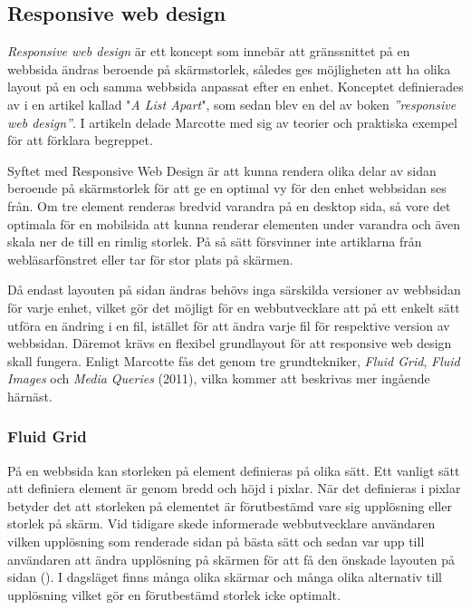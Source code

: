 \documentclass[11pt]{article}
\begin{document}
\subsection{Responsive web design}
\textit{Responsive web design} är ett koncept som innebär att gränssnittet på en webbsida ändras beroende på skärmstorlek, således ges möjligheten att ha olika layout på en och samma webbsida anpassat efter en enhet. Konceptet definierades av \cite{resp} i en artikel kallad "\textit{A List Apart}", som sedan blev en del av boken \textit{”responsive web design”}. I artikeln delade Marcotte med sig av teorier och praktiska exempel för att förklara begreppet. 

Syftet med Responsive Web Design är att kunna rendera olika delar av sidan beroende på skärmstorlek för att ge en optimal vy för den enhet webbsidan ses från. Om tre element renderas bredvid varandra på en desktop sida, så vore det optimala för en mobilsida att kunna renderar elementen under varandra och även skala ner de till en rimlig storlek. På så sätt försvinner inte artiklarna från webläsarfönstret eller tar för stor plats på skärmen.

Då endast layouten på sidan ändras behövs inga särskilda versioner av webbsidan för varje enhet, vilket gör det möjligt för en webbutvecklare att på ett enkelt sätt utföra en ändring i en fil, istället för att ändra varje fil för respektive version av webbsidan. Däremot krävs en flexibel grundlayout för att responsive web design skall fungera. Enligt Marcotte fås det genom tre grundtekniker, \textit{Fluid Grid}, \textit{Fluid Images} och \textit{Media Queries} (2011), vilka kommer att beskrivas mer ingående härnäst.

\subsubsection{Fluid Grid}
På en webbsida kan storleken på element definieras på olika sätt. Ett vanligt sätt att definiera element är genom bredd och höjd i pixlar. När det definieras i pixlar betyder det att storleken på elementet är förutbestämd vare sig upplösning eller storlek på skärm. Vid tidigare skede informerade webbutvecklare användaren vilken upplösning som renderade sidan på bästa sätt och sedan var upp till användaren att ändra upplösning på skärmen för att få den önskade layouten på sidan (\cite[s. 6]{resp}). I dagsläget finns många olika skärmar och många olika alternativ till upplösning vilket gör en förutbestämd storlek icke optimalt. 
\end{document}
